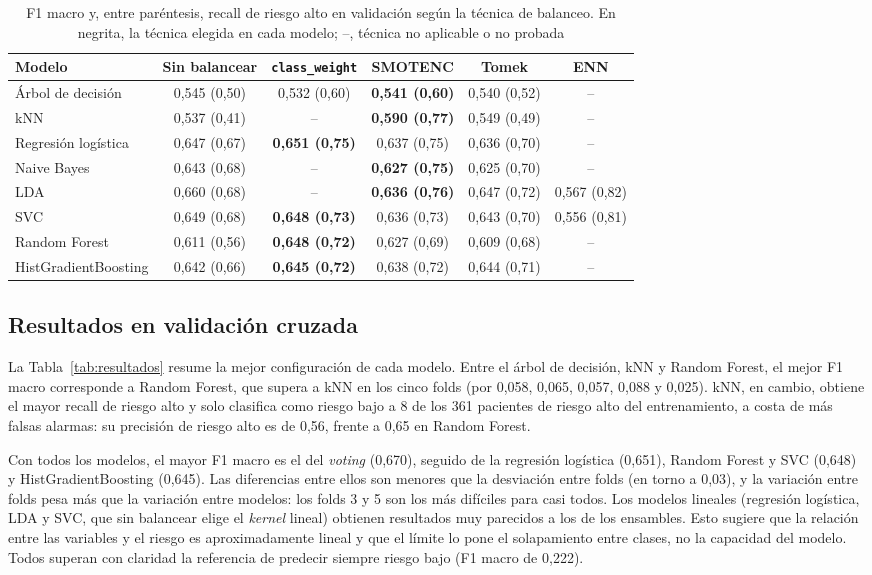 \documentclass[journal,onecolumn]{IEEEtran}
\begin{document}
\begin{table}[H]
\caption{F1 macro y, entre paréntesis, recall de riesgo alto en validación según la técnica de
balanceo.
En negrita, la técnica elegida en cada modelo; --, técnica no aplicable o no probada}
\label{tab:preprocesamiento}
\centering
\begin{tabular}{l c c c c c}
\hline
Modelo & Sin balancear & \texttt{class\_weight} & SMOTENC & Tomek & ENN \\
\hline
Árbol de decisión & 0,545 (0,50) & 0,532 (0,60) & \textbf{0,541 (0,60)} & 0,540 (0,52) & -- \\
kNN & 0,537 (0,41) & -- & \textbf{0,590 (0,77)} & 0,549 (0,49) & -- \\
Regresión logística & 0,647 (0,67) & \textbf{0,651 (0,75)} & 0,637 (0,75) & 0,636 (0,70) & -- \\
Naive Bayes & 0,643 (0,68) & -- & \textbf{0,627 (0,75)} & 0,625 (0,70) & -- \\
LDA & 0,660 (0,68) & -- & \textbf{0,636 (0,76)} & 0,647 (0,72) & 0,567 (0,82) \\
SVC & 0,649 (0,68) & \textbf{0,648 (0,73)} & 0,636 (0,73) & 0,643 (0,70) & 0,556 (0,81) \\
Random Forest & 0,611 (0,56) & \textbf{0,648 (0,72)} & 0,627 (0,69) & 0,609 (0,68) & -- \\
HistGradientBoosting & 0,642 (0,66) & \textbf{0,645 (0,72)} & 0,638 (0,72) & 0,644 (0,71) & -- \\
\hline
\end{tabular}
\end{table}

\subsection{Resultados en validación cruzada}
La Tabla~\ref{tab:resultados} resume la mejor configuración de cada modelo.
Entre el árbol de decisión, kNN y Random Forest, el mejor F1 macro corresponde a Random Forest, que
supera a kNN en los cinco folds (por 0,058, 0,065, 0,057, 0,088 y 0,025). kNN, en cambio, obtiene el
mayor recall de riesgo alto y solo clasifica como riesgo bajo a 8 de los 361 pacientes de riesgo
alto del entrenamiento, a costa de más falsas alarmas: su precisión de riesgo alto es de 0,56,
frente a 0,65 en Random Forest.

Con todos los modelos, el mayor F1 macro es el del \textit{voting} (0,670), seguido de la regresión
logística (0,651), Random Forest y SVC (0,648) y HistGradientBoosting (0,645).
Las diferencias entre ellos son menores que la desviación entre folds (en torno a 0,03), y la
variación entre folds pesa más que la variación entre modelos: los folds 3 y 5 son los más difíciles
para casi todos.
Los modelos lineales (regresión logística, LDA y SVC, que sin balancear elige el \textit{kernel}
lineal) obtienen resultados muy parecidos a los de los ensambles.
Esto sugiere que la relación entre las variables y el riesgo es aproximadamente lineal y que el
límite lo pone el solapamiento entre clases, no la capacidad del modelo. Todos superan con claridad 
la referencia de predecir siempre riesgo bajo (F1 macro de 0,222).
\end{document}
